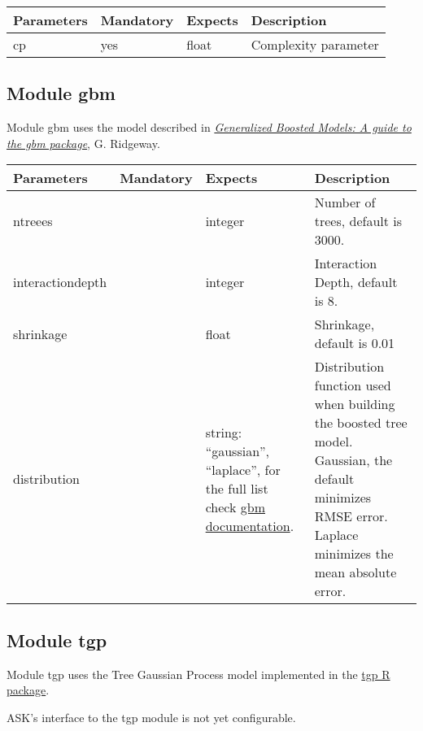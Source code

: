 	\vspace{0.5cm}\begin{tabular}{| p{} | p{} | p{} | p{}  |}
		\hline
		\textbf{ Parameters} & \textbf{ Mandatory} & \textbf{ Expects} & \textbf{ Description} \\ \hline
		 cp &  yes &  float &  Complexity parameter \\ \hline
	\end{tabular}

\subsection{Module gbm}

Module gbm uses the model described in \href{http://cran.r-project.org/web/packages/gbm/}{\emph{Generalized Boosted Models: A guide to the gbm package}}, G. Ridgeway.

	\vspace{0.5cm}\begin{tabular}{| p{} | p{} | p{} | p{}  |}
		\hline
		\textbf{ Parameters} & \textbf{ Mandatory} & \textbf{ Expects} & \textbf{ Description} \\ \hline
		 ntreees &   &  integer &  Number of trees, default is 3000. \\ \hline
		 interactiondepth &   &  integer &  Interaction Depth, default is 8. \\ \hline
		 shrinkage &   &  float &  Shrinkage, default is 0.01 \\ \hline
		 distribution &   &  string: ``gaussian'', ``laplace'', for the full list check \href{http://cran.r-project.org/web/packages/gbm/}{gbm documentation}. &  Distribution function used when building the boosted tree model. Gaussian, the default minimizes RMSE error. Laplace minimizes the mean absolute error. \\ \hline
	\end{tabular}

\subsection{Module tgp}

Module tgp uses the Tree Gaussian Process model implemented in the \href{http://cran.r-project.org/web/packages/tgp/}{tgp R package}.

ASK's interface to the tgp module is not yet configurable.

